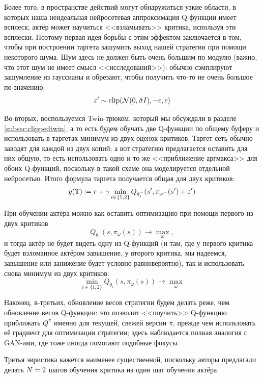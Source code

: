 Более того, в пространстве действий могут обнаружиться узкие области, в которых наша неидеальная нейросетевая аппроксимация Q-функции имеет всплеск; актёр может научиться <<взламывать>> критика, используя эти всплески. Поэтому первая идея борьбы с этим эффектом заключается в том, чтобы при построении таргета зашумить выход нашей стратегии при помощи некоторого шума. Шум здесь не должен быть очень большим по модулю (важно, что этот шум не имеет смысл <<исследований>>): обычно сэмплируют зашумление из гауссианы и обрезают, чтобы получить что-то не очень большое по значению:
$$\varepsilon' \sim \mathrm{clip}(\mathcal{N}(0, \hat{\sigma}I), -c, c)$$

Во-вторых, воспользуемся Twin-трюком, который мы обсуждали в разделе \ref{subsec:clippedtwin}, а то есть будем обучать две Q-функции по общему буферу и использовать в таргетах минимум из двух оценок критиков. Таргет-сеть обычно заводят для каждой из двух копий; а вот стратегию предлагается оставить для них общую, то есть использовать одно и то же <<приближение аргмакса>> для обоих Q-функций, поскольку в такой схеме она моделируется отдельной нейросетью. Итого формула таргета получается общая для двух критиков:
$$y(\mathbb{T} ) \coloneqq r + \gamma \min_{i \in \{1, 2\}}Q_{\theta_i^{-}}( s', \pi_{\omega^{-}}(s') + \varepsilon')$$

При обучении актёра можно как оставить оптимизацию при помощи первого из двух критиков
$$Q_{\theta_1}(s, \pi_\omega(s)) \to \max_{\omega},$$
и тогда актёр не будет видеть одну из Q-функций (и там, где у первого критика будет взломанное актёром завышение, у второго критика, мы надеемся, завышение или занижение будет условно равновероятно), так и использовать снова минимум из двух критиков:
$$\min_{i \in \{1, 2\}} Q_{\theta_i}(s, \pi_\omega(s)) \to \max_{\omega}$$

Наконец, в-третьих, обновление весов стратегии будем делать реже, чем обновление весов Q-функции: это позволит <<поучить>> Q-функцию приближать $Q^\pi$ именно для текущей, свежей версии $\pi$, прежде чем использовать её градиент для оптимизации стратегии; здесь наблюдается полная аналогия с GAN-ами, где тоже иногда помогают подобные фокусы.

\begin{remark}
Третья эвристика кажется наименее существенной, поскольку авторы предлагали делать $N \HM= 2$ шагов обучения критика на один шаг обучения актёра.
\end{remark}

